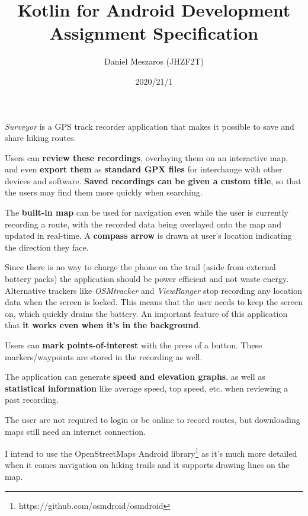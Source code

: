 \documentclass{exam}
\begin{document}
\title{Kotlin for Android Development Assignment Specification}
\author{Daniel Meszaros (JHZF2T)}
\date{2020/21/1}

\emph{Surveyor} is a GPS track recorder application that makes it
possible to save and share hiking routes.

Users can \textbf{review these recordings}, overlaying them on an interactive
map, and even \textbf{export them} as \textbf{standard GPX files} for
interchange with other devices and software.
\textbf{Saved recordings can be given a custom title}, so that the users may
find them more quickly when searching.

The \textbf{built-in map} can be used for navigation even while the user is currently
recording a route, with the recorded data being overlayed onto the map and
updated in real-time.
A \textbf{compass arrow} is drawn at user's location indicating the direction
they face.

Since there is no way to charge the phone on the trail (aside from external
battery packs) the application should be power efficient and not waste energy.
Alternative trackers like \emph{OSMtracker} and \emph{ViewRanger} stop recording
any location data when the screen is locked.
This means that the user needs to keep the screen on, which quickly drains the
battery.
An important feature of this application that \textbf{it works even when it's
in the background}.

Users can \textbf{mark points-of-interest} with the press of a button. These
markers/waypoints are stored in the recording as well.

The application can generate \textbf{speed and elevation graphs}, as well as
\textbf{statistical information} like average speed, top speed, etc. when
reviewing a past recording.

The user are not required to login or be online to record routes, but
downloading maps still need an internet connection.

I intend to use the OpenStreetMaps Android
library\footnote{https://github.com/osmdroid/osmdroid} as it's much more
detailed when it comes navigation on hiking trails and it supports drawing lines
on the map.
\end{document}
